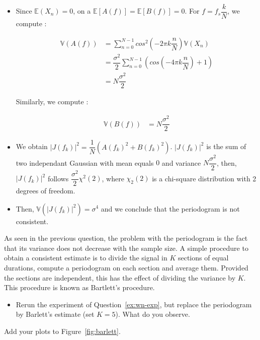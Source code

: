 \documentclass[11pt]{article}
\begin{document}
\begin{solution}

    \begin{itemize}
        \item Since $\mathbb{E}(X_n) = 0$, on a $\mathbb{E}[A(f)] = \mathbb{E}[B(f)] = 0$. For $f = f_s \dfrac{k}{N}$, we compute : 
        
        \begin{align*}
            \mathbb{V}(A(f)) & = \sum_{n=0}^{N-1} cos^2(-2\pi k \dfrac{n}{N})\mathbb{V}(X_n)\\
            & = \dfrac{\sigma^2}{2} \sum_{n=0}^{N-1} (cos(-4\pi k \dfrac{n}{N}) + 1 ) \\
            & = N\dfrac{\sigma^2}{2}
        \end{align*}

        Similarly, we compute : 

        \begin{align*}
            \mathbb{V}(B(f)) & = N\dfrac{\sigma^2}{2}
        \end{align*}

        \item We obtain $|J(f_k)|^2 = \dfrac{1}{N} (A(f_k)^2 + B(f_k)^2)$.
        $|J(f_k)|^2$ is the sum of two independant Gaussian with mean equals $0$ and variance $N\dfrac{\sigma^2}{2}$, then, $|J(f_k)|^2$ follows $\dfrac{\sigma^2}{2} \chi^2(2)$, where $\chi_2(2)$ is a chi-square distribution with 2 degrees of freedom.

        \item Then, $\mathbb{V}(|J(f_k)|^2) = \sigma^4$ and we conclude that the periodogram is not consistent.
        
    \end{itemize}
    
\end{solution}

\begin{exercise}\label{q:barlett}
    As seen in the previous question, the problem with the periodogram is the fact that its variance does not decrease with the sample size.
    A simple procedure to obtain a consistent estimate is to divide the signal in $K$ sections of equal durations, compute a periodogram on each section and average them.
    Provided the sections are independent, this has the effect of dividing the variance by $K$. 
    This procedure is known as Bartlett's procedure.
    \begin{itemize}
        \item Rerun the experiment of Question~\ref{ex:wn-exp}, but replace the periodogram by Barlett's estimate (set $K=5$). What do you observe.
    \end{itemize}
    Add your plots to Figure~\ref{fig:barlett}.
\end{exercise}
\end{document}
